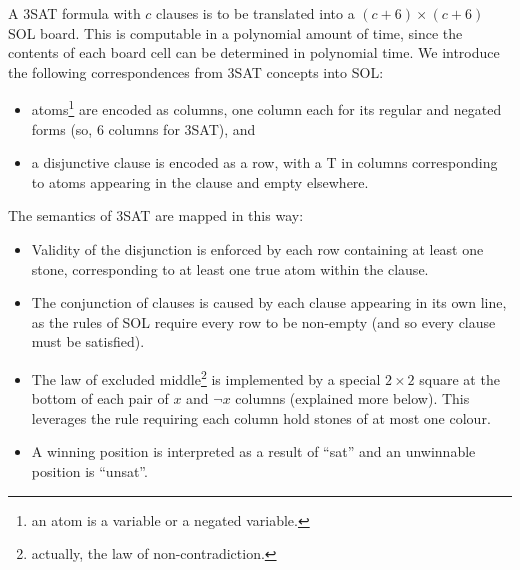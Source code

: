 \documentclass[a4paper]{article}
\begin{document}
A 3SAT formula with $c$ clauses is to be translated into a
$(c+6)\times(c+6)$ SOL board.
This is computable in a polynomial amount of time, since the contents
of each board cell can be determined in polynomial time.
We introduce the following correspondences
from 3SAT concepts into SOL:
\begin{itemize}
  \setlength{\itemsep}{0pt}
  \item atoms\footnote{an atom is a variable or a negated variable.} are encoded as columns, one column each for its regular and negated forms
    (so, 6 columns for 3SAT), and
  \item a disjunctive clause is encoded as a row,
    with a T in columns corresponding to atoms appearing in the clause and empty elsewhere.
\end{itemize}
The semantics of 3SAT are mapped in this way:
\begin{itemize}
  \setlength{\itemsep}{0pt}
  \item Validity of the
    disjunction is enforced by each row containing at least one stone,
    corresponding to at least one true atom within the clause. 
  \item The conjunction of clauses is caused by each clause appearing in its own line, as 
    the rules of SOL require every row to be non-empty (and so every clause must be satisfied).
  \item The law of excluded middle\footnote{actually, the law of non-contradiction.} is implemented by a special $2\times2$
    square at the bottom of each pair of $x$ and $\neg x$ columns (explained more below).
    This leverages the rule requiring 
    each column hold stones of at most one colour. 
  \item A winning position is interpreted as a result of ``sat'' and an unwinnable
    position is ``unsat''.
\end{itemize}
\end{document}
